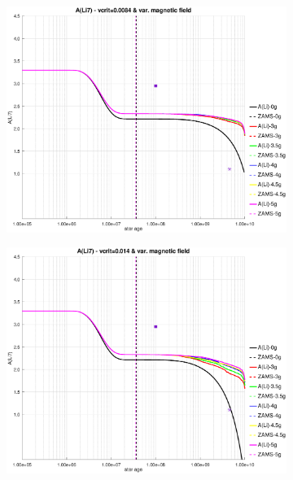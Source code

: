 \documentclass[fleqn,usenatbib]{mnras}
\begin{document}
{{\begin{figure}
    \centering
    \begin{subfigure}[h]{0.47\textwidth}
    \includegraphics[trim = 35mm 15mm 15mm 15mm, clip,width=\textwidth]{figures/li_vc_0084_var_g.eps}
    \label{fig:subim21}
    \end{subfigure}
    \begin{subfigure}[h]{0.47\textwidth}
    \includegraphics[trim = 35mm 15mm 15mm 15mm, clip,width=\textwidth]{figures/li_vc_014_var_g.eps}
    \label{fig:subim22}
    \end{subfigure}

\end{figure}}}
\end{document}

